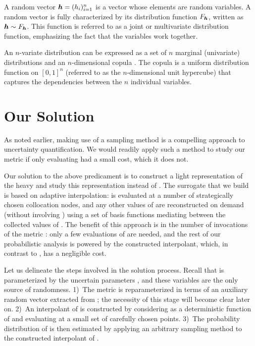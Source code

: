A random vector $\boldsymbol{h} = (h_i)_{i = 1}^n$ is a vector whose elements are random
variables. A random vector is fully characterized by its distribution function
$F_{\boldsymbol{h}}$, written as $\boldsymbol{h} \sim F_{\boldsymbol{h}}$. This function is referred to as a
joint or multivariate distribution function, emphasizing the fact that the
variables work together.

An $n$-variate distribution can be expressed as a set of $n$ marginal
(univariate) distributions and an $n$-dimensional copula \cite{nelsen2006}. The
copula is a uniform distribution function on $[0, 1]^n$ (referred to as the
$n$-dimensional unit hypercube) that captures the dependencies between the $n$
individual variables.

\section{Our Solution}

As noted earlier, making use of a sampling method is a compelling approach to
uncertainty quantification. We would readily apply such a method to study our
metric \g if only evaluating \g had a small cost, which it does not.

Our solution to the above predicament is to construct a light representation of
the heavy \g and study this representation instead of \g. The surrogate that we
build is based on adaptive interpolation: \g is evaluated at a number of
strategically chosen collocation nodes, and any other values of \g are
reconstructed on demand (without involving \g) using a set of basis functions
mediating between the collected values of \g. The benefit of this approach is in
the number of invocations of the metric \g: only a few evaluations of \g are
needed, and the rest of our probabilistic analysis is powered by the constructed
interpolant, which, in contrast to \g, has a negligible cost.

Let us delineate the steps involved in the solution process. Recall that \g is
parameterized by the uncertain parameters \vu, and these variables are the only
source of randomness. 1)~The metric \g is reparameterized in terms of an
auxiliary random vector \vz extracted from \vu; the necessity of this stage will
become clear later on. 2)~An interpolant of \g is constructed by considering \g
as a deterministic function of \vz and evaluating \g at a small set of carefully
chosen points. 3)~The probability distribution of \g is then estimated by
applying an arbitrary sampling method to the constructed interpolant of \g.

